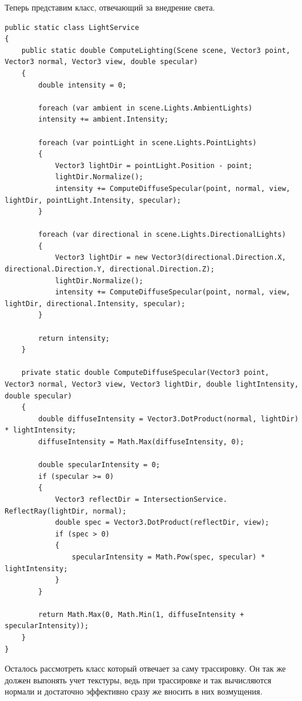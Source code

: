 Теперь представим класс, отвечающий за внедрение света.
\begin{lstlisting}[caption={Класс LightService}, label={lst:3-3}]
public static class LightService
{
	public static double ComputeLighting(Scene scene, Vector3 point, Vector3 normal, Vector3 view, double specular)
	{
		double intensity = 0;
		
		foreach (var ambient in scene.Lights.AmbientLights)
		intensity += ambient.Intensity;
		
		foreach (var pointLight in scene.Lights.PointLights)
		{
			Vector3 lightDir = pointLight.Position - point;
			lightDir.Normalize();
			intensity += ComputeDiffuseSpecular(point, normal, view, lightDir, pointLight.Intensity, specular);
		}
		
		foreach (var directional in scene.Lights.DirectionalLights)
		{
			Vector3 lightDir = new Vector3(directional.Direction.X, directional.Direction.Y, directional.Direction.Z);
			lightDir.Normalize();
			intensity += ComputeDiffuseSpecular(point, normal, view, lightDir, directional.Intensity, specular);
		}
		
		return intensity;
	}
	
	private static double ComputeDiffuseSpecular(Vector3 point, Vector3 normal, Vector3 view, Vector3 lightDir, double lightIntensity, double specular)
	{
		double diffuseIntensity = Vector3.DotProduct(normal, lightDir) * lightIntensity;
		diffuseIntensity = Math.Max(diffuseIntensity, 0);
		
		double specularIntensity = 0;
		if (specular >= 0)
		{
			Vector3 reflectDir = IntersectionService. ReflectRay(lightDir, normal);
			double spec = Vector3.DotProduct(reflectDir, view);
			if (spec > 0)
			{
				specularIntensity = Math.Pow(spec, specular) * lightIntensity;
			}
		}
		
		return Math.Max(0, Math.Min(1, diffuseIntensity + specularIntensity));
	}
}
\end{lstlisting}

Осталось рассмотреть класс который отвечает за саму трассировку. Он так же должен выпонять учет текстуры, ведь при трассировке и так вычисляются нормали и достаточно эффективно сразу же вносить в них возмущения.

